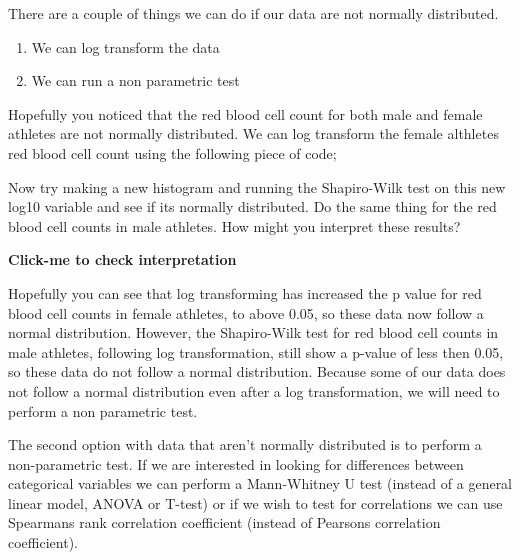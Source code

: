 \documentclass[
]{book}
\newenvironment{Shaded}{\begin{snugshade}}{\end{snugshade}}
\newcommand{\AttributeTok}[1]{\textcolor[rgb]{0.13,0.29,0.53}{#1}}
\newcommand{\CommentTok}[1]{\textcolor[rgb]{0.56,0.35,0.01}{\textit{#1}}}
\newcommand{\FunctionTok}[1]{\textcolor[rgb]{0.13,0.29,0.53}{\textbf{#1}}}
\newcommand{\NormalTok}[1]{#1}
\newcommand{\OtherTok}[1]{\textcolor[rgb]{0.56,0.35,0.01}{#1}}
\newcommand{\SpecialCharTok}[1]{\textcolor[rgb]{0.81,0.36,0.00}{\textbf{#1}}}
\providecommand{\tightlist}{%
  \setlength{\itemsep}{0pt}\setlength{\parskip}{0pt}}
\begin{document}
There are a couple of things we can do if our data are not normally distributed.

\begin{enumerate}
\def\labelenumi{\arabic{enumi})}
\tightlist
\item
  We can log transform the data
\item
  We can run a non parametric test
\end{enumerate}

Hopefully you noticed that the red blood cell count for both male and female athletes are not normally distributed. We can log transform the female althletes red blood cell count using the following piece of code;

\begin{Shaded}
\end{Shaded}

Now try making a new histogram and running the Shapiro-Wilk test on this new log10 variable and see if its normally distributed. Do the same thing for the red blood cell counts in male athletes. How might you interpret these results?

\textbf{Click-me to check interpretation}

Hopefully you can see that log transforming has increased the p value for red blood cell counts in female athletes, to above 0.05, so these data now follow a normal distribution. However, the Shapiro-Wilk test for red blood cell counts in male athletes, following log transformation, still show a p-value of less then 0.05, so these data do not follow a normal distribution. Because some of our data does not follow a normal distribution even after a log transformation, we will need to perform a non parametric test.

The second option with data that aren't normally distributed is to perform a non-parametric test. If we are interested in looking for differences between categorical variables we can perform a Mann-Whitney U test (instead of a general linear model, ANOVA or T-test) or if we wish to test for correlations we can use Spearmans rank correlation coefficient (instead of Pearsons correlation coefficient).
\end{document}
